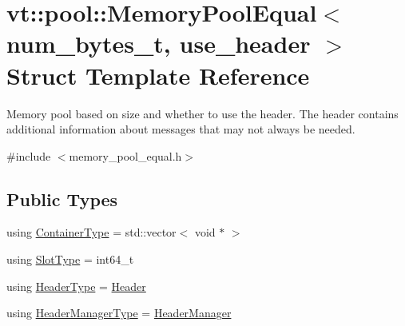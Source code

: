 \hypertarget{structvt_1_1pool_1_1_memory_pool_equal}{}\section{vt\+:\+:pool\+:\+:Memory\+Pool\+Equal$<$ num\+\_\+bytes\+\_\+t, use\+\_\+header $>$ Struct Template Reference}
\label{structvt_1_1pool_1_1_memory_pool_equal}


Memory pool based on size and whether to use the header. The header contains additional information about messages that may not always be needed.  




{\ttfamily \#include $<$memory\+\_\+pool\+\_\+equal.\+h$>$}

\subsection*{Public Types}
\begin{DoxyCompactItemize}
\item 
using \hyperlink{structvt_1_1pool_1_1_memory_pool_equal_adfcfe5caf881b17d4c0355291c4f707f}{Container\+Type} = std\+::vector$<$ void $\ast$ $>$
\item 
using \hyperlink{structvt_1_1pool_1_1_memory_pool_equal_af05a2c24c95c666b20e3758745be746b}{Slot\+Type} = int64\+\_\+t
\item 
using \hyperlink{structvt_1_1pool_1_1_memory_pool_equal_a26a1a8d38f35edec102a47d7b177bfb2}{Header\+Type} = \hyperlink{structvt_1_1pool_1_1_header}{Header}
\item 
using \hyperlink{structvt_1_1pool_1_1_memory_pool_equal_aede857d1f5e084ce6a25f9a499c74047}{Header\+Manager\+Type} = \hyperlink{structvt_1_1pool_1_1_header_manager}{Header\+Manager}
\end{DoxyCompactItemize}
